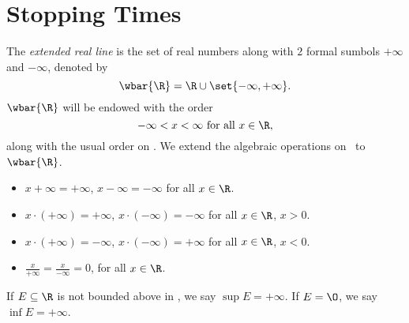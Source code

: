 \section{Stopping Times} \label{sec:stopping_times}
\begin{definition} \label{def:extended_reals}
    The \emph{extended real line} is the set of real numbers along with $2$
    formal sumbols $+\infty$ and $-\infty$, denoted by \[
        \wbar{\R} = \R \cup \set{-\infty, +\infty}.
    \]
    $\wbar{\R}$ will be endowed with the order \[
        -\infty < x < \infty \text{ for all } x \in \R,
    \] along with the usual order on \R.
    We extend the algebraic operations on \R\ to $\wbar{\R}$.
    \begin{itemize}
        \item $x + \infty = +\infty$, $x - \infty = -\infty$ for all
            $x \in \R$.
        \item $x \cdot (+\infty) = +\infty$, $x \cdot (-\infty) = -\infty$
            for all $x \in \R$, $x > 0$.
        \item $x \cdot (+\infty) = -\infty$, $x \cdot (-\infty) = +\infty$
            for all $x \in \R$, $x < 0$.
        \item $\frac{x}{+\infty} = \frac{x}{-\infty} = 0$, for all
            $x \in \R$.
    \end{itemize}
    If $E \subseteq \R$ is not bounded above in \R, we say
    $\sup E = +\infty$.
    If $E = \O$, we say $\inf E = +\infty$.
\end{definition}

